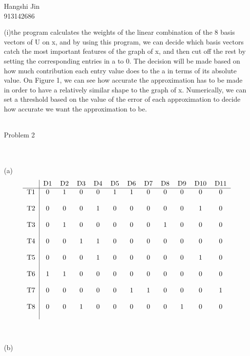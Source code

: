 \documentclass{article}
\begin{document}
\begin{flushright}Hangshi Jin\\913142686\end{flushright}
(i)the program calculates the weights of the linear combination of the 8 basis vectors of U on x, and by using this program, we can decide which basis vectors catch the most important features of the graph of x, and then cut off the rest by setting the corresponding entries in a to 0. The decision will be made based on how much contribution each entry value does to the a in terms of its absolute value. On Figure 1, we can see how accurate the approximation has to be made in order to have a relatively similar shape to the graph of x.  Numerically, we can set a threshold based on the value of the error of each approximation to decide how accurate we want the approximation to be.
\\\\\begin{large}Problem 2\end{large}
\\\\(a)\\
\[\begin{tabular}{c|c c c c c c c c c c c}
 & D1 & D2 & D3 & D4 & D5 & D6 & D7 & D8 & D9 & D10 & D11\\
 \hline
 T1 & 0 & 1 & 0 & 0 & 1 & 1 & 0 & 0 & 0 & 0 & 0 \\\\
 T2 & 0 & 0 & 0 & 1 & 0 & 0 & 0 & 0 & 0 & 1 & 0 \\\\
 T3 & 0 & 1 & 0 & 0 & 0 & 0 & 0 & 1 & 0 & 0 & 0 \\\\
 T4 & 0 & 0 & 1 & 1 & 0 & 0 & 0 & 0 & 0 & 0 & 0 \\\\
 T5 & 0 & 0 & 0 & 1 & 0 & 0 & 0 & 0 & 0 & 1 & 0 \\\\
 T6 & 1 & 1 & 0 & 0 & 0 & 0 & 0 & 0 & 0 & 0 & 0 \\\\
 T7 & 0 & 0 & 0 & 0 & 0 & 1 & 1 & 0 & 0 & 0 & 1 \\\\
 T8 & 0 & 0 & 1 & 0 & 0 & 0 & 0 & 0 & 1 & 0 & 0 \\\\
\end{tabular}
\]
\\\\(b)
\setcounter{MaxMatrixCols}{11}
\end{document}
